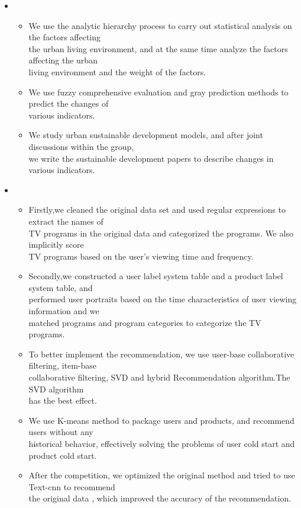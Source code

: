   \begin{itemize}[leftmargin=*]
    \item
      {\small
      \begin{itemize}
      \item We use the analytic hierarchy process to carry out statistical analysis on the factors affecting \\the urban living environment, and at the same time analyze the factors affecting the urban \\living environment and the weight of the factors.
        \item We use fuzzy comprehensive evaluation and gray prediction methods to predict the changes of \\various indicators.
        \item We study urban sustainable development models, and after joint discussions within the group, \\we write the sustainable development papers to describe changes in various indicators.
      \end{itemize}
      }
    
    \item
      {\small
      \begin{itemize}
        \item Firstly,we cleaned the original data set and used regular expressions to extract the names of \\TV programs in the original data and categorized the programs. We also implicitly score\\ TV programs based on the user's viewing time and frequency.
        \item Secondly,we constructed a user label system table and a product label system table, and \\performed user portraits based on the time characteristics of user viewing information and we \\matched programs and program categories
to categorize the TV programs.
        \item  To better implement the recommendation, we use  user-base collaborative filtering, item-base \\collaborative filtering, SVD and hybrid Recommendation algorithm.The SVD algorithm\\ has the best effect.
		\item We use K-means method to package users and products, and recommend users without any \\ historical behavior, effectively solving the problems of user cold start and product cold start.
        \item After the competition, we optimized the original method and tried to use Text-cnn to recommend \\the original data , which improved the accuracy of the recommendation.
      \end{itemize}
      }


\end{itemize}
